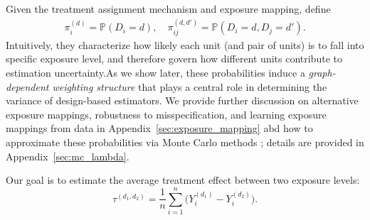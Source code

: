 \documentclass{article}
\theoremstyle{plain}
\theoremstyle{definition}
\theoremstyle{remark}
\newcommand{\bY}{\boldsymbol{Y}}
\newcommand{\bZero}{\boldsymbol{0}}
\begin{document}
Given the treatment assignment mechanism and exposure mapping, define 
\begin{align}
\pi_i^{(d)} = \mathbb{P}(D_i = d), \quad
\pi_{ij}^{(d,d')} = \mathbb{P}(D_i = d, D_j = d').
\end{align}
 Intuitively, they characterize how likely each unit (and pair of units) is to fall into specific exposure level, and therefore govern how different units contribute to estimation uncertainty.As we show later, these probabilities induce a \emph{graph-dependent weighting structure} that plays a central role in determining the variance of design-based estimators. We provide further discussion on alternative exposure mappings, robustness to misspecification, and learning exposure mappings from data in Appendix~\ref{sec:exposure_mapping} abd  
how to approximate these probabilities via Monte Carlo methods \citep{aronow2017estimating}; details are provided in Appendix~\ref{sec:mc_lambda}.

Our goal is to estimate the average treatment effect between two exposure levels:
\[
\tau^{(d_1,d_2)} = \frac{1}{n} \sum_{i=1}^n \bigl( Y_i^{(d_1)} - Y_i^{(d_2)} \bigr).
\]



\end{document}
